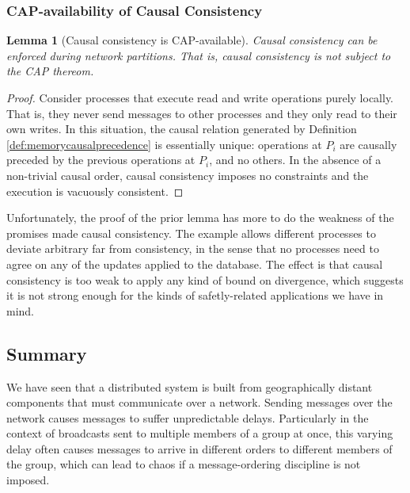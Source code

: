 \documentclass[]             %
{NASA}                       %
\newtheorem{lemma}[theorem]{Lemma}
\theoremstyle{definition}
\begin{document}
\afterpage{\clearpage}

\subsubsection{CAP-availability of Causal Consistency}
\label{the-cap-theorem}

\begin{lemma}[Causal consistency is CAP-available]
  \label{thm:cap-causal}
  Causal consistency can be enforced during network partitions. That
  is, causal consistency is not subject to the CAP thereom.
\end{lemma}
\begin{proof}
  Consider processes that execute read and write operations purely
  locally. That is, they never send messages to other processes and
  they only read to their own writes. In this situation, the causal
  relation generated by Definition \ref{def:memorycausalprecedence} is
  essentially unique: operations at $P_i$ are causally preceded by the
  previous operations at $P_i$, and no others. In the absence of a
  non-trivial causal order, causal consistency imposes no constraints
  and the execution is vacuously consistent.
\end{proof}

Unfortunately, the proof of the prior lemma has more to do the
weakness of the promises made causal consistency. The example allows
different processes to deviate arbitrary far from consistency, in the
sense that no processes need to agree on any of the updates applied to
the database. The effect is that causal consistency is too weak to
apply any kind of bound on divergence, which suggests it is not strong
enough for the kinds of safetly-related applications we have in mind.

\subsection{Summary}
\label{sec:background-summary}

We have seen that a distributed system is built from geographically
distant components that must communicate over a network. Sending
messages over the network causes messages to suffer unpredictable
delays. Particularly in the context of broadcasts sent to multiple
members of a group at once, this varying delay often causes messages
to arrive in different orders to different members of the group, which
can lead to chaos if a message-ordering discipline is not imposed.
\end{document}
